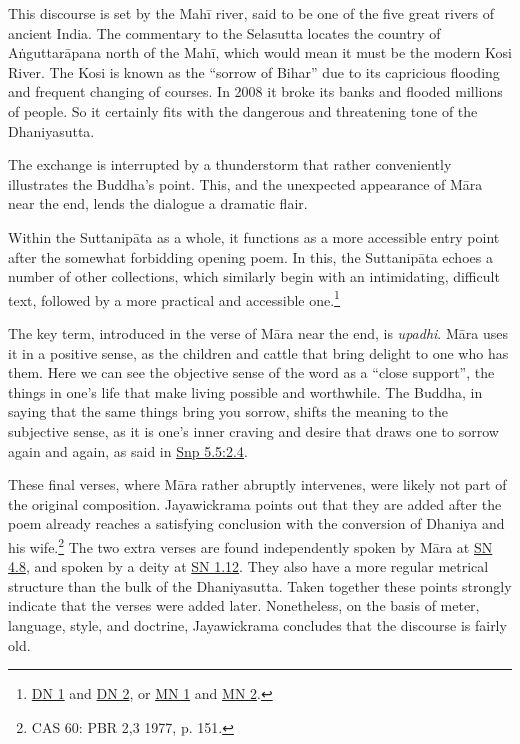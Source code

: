 \documentclass[12pt,openany]{book}%
\begin{document}
This discourse is set by the \textsanskrit{Mahī} river, said to be one of the five great rivers of ancient India. The commentary to the Selasutta locates the country of \textsanskrit{Aṅguttarāpana} north of the \textsanskrit{Mahī}, which would mean it must be the modern Kosi River. The Kosi is known as the “sorrow of Bihar” due to its capricious flooding and frequent changing of courses. In 2008 it broke its banks and flooded millions of people. So it certainly fits with the dangerous and threatening tone of the Dhaniyasutta.

The exchange is interrupted by a thunderstorm that rather conveniently illustrates the Buddha’s point. This, and the unexpected appearance of \textsanskrit{Māra} near the end, lends the dialogue a dramatic flair.

Within the \textsanskrit{Suttanipāta} as a whole, it functions as a more accessible entry point after the somewhat forbidding opening poem. In this, the \textsanskrit{Suttanipāta} echoes a number of other collections, which similarly begin with an intimidating, difficult text, followed by a more practical and accessible one.\footnote{\href{https://suttacentral.net/dn1/en/sujato}{DN 1} and \href{https://suttacentral.net/dn2/en/sujato}{DN 2}, or \href{https://suttacentral.net/mn1/en/sujato}{MN 1} and \href{https://suttacentral.net/mn2/en/sujato}{MN 2}. }

The key term, introduced in the verse of \textsanskrit{Māra} near the end, is \textit{upadhi}. \textsanskrit{Māra} uses it in a positive sense, as the children and cattle that bring delight to one who has them. Here we can see the objective sense of the word as a “close support”, the things in one’s life that make living possible and worthwhile. The Buddha, in saying that the same things bring you sorrow, shifts the meaning to the subjective sense, as it is one’s inner craving and desire that draws one to sorrow again and again, as said in \href{https://suttacentral.net/snp5.5/en/sujato\#2.4}{Snp 5.5:2.4}.

These final verses, where \textsanskrit{Māra} rather abruptly intervenes, were likely not part of the original composition. Jayawickrama points out that they are added after the poem already reaches a satisfying conclusion with the conversion of Dhaniya and his wife.\footnote{CAS 60: PBR 2,3 1977, p. 151. } The two extra verses are found independently spoken by \textsanskrit{Māra} at \href{https://suttacentral.net/sn4.8/en/sujato}{SN 4.8}, and spoken by a deity at \href{https://suttacentral.net/sn1.12/en/sujato}{SN 1.12}. They also have a more regular metrical structure than the bulk of the Dhaniyasutta. Taken together these points strongly indicate that the verses were added later. Nonetheless, on the basis of meter, language, style, and doctrine, Jayawickrama concludes that the discourse is fairly old.
\end{document}
